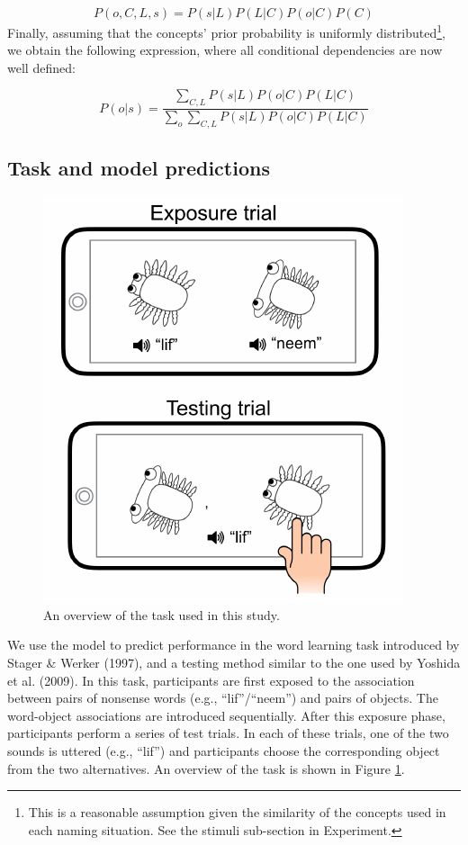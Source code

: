 \documentclass[10pt, letterpaper]{article}
\newenvironment{CodeChunk}{}{}
\begin{document}
\[P(o,C,L,s) = P(s|L)P(L|C)P(o|C)P(C) \] Finally, assuming that the
concepts' prior probability is uniformly
distributed\footnote{This is a reasonable assumption given the similarity of the concepts used in each naming situation. See the stimuli sub-section in Experiment.},
we obtain the following expression, where all conditional dependencies
are now well defined:

\begin{equation}
P(o|s) = \frac{\sum_{C,L} P(s|L)P(o|C)P(L|C)}{\sum_{o} \sum_{C,L} P(s|L)P(o|C)P(L|C)}
\end{equation}

\subsection{Task and model
predictions}\label{task-and-model-predictions}

\begin{CodeChunk}
\begin{figure}[t]

{\centering \includegraphics{figs/task-1} 

}

\caption{\label{fig:task}An overview of the task used in this study.}\label{fig:task}
\end{figure}
\end{CodeChunk}

We use the model to predict performance in the word learning task
introduced by Stager \& Werker (1997), and a testing method similar to
the one used by Yoshida et al. (2009). In this task, participants are
first exposed to the association between pairs of nonsense words (e.g.,
``lif''/``neem'') and pairs of objects. The word-object associations are
introduced sequentially. After this exposure phase, participants perform
a series of test trials. In each of these trials, one of the two sounds
is uttered (e.g., ``lif'') and participants choose the corresponding
object from the two alternatives. An overview of the task is shown in
Figure \ref{fig:task}.
\end{document}
